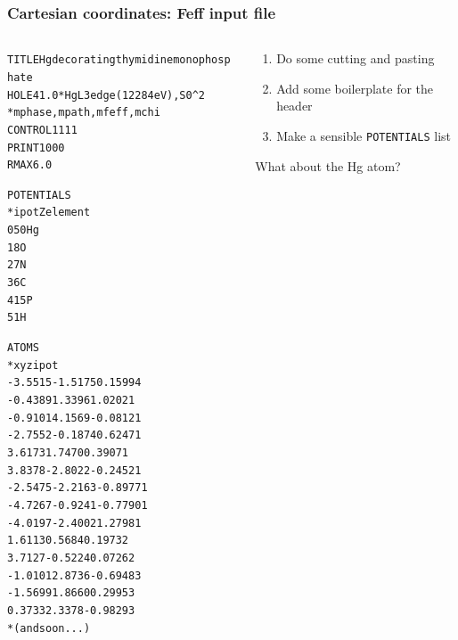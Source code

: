 \documentclass[10pt, xcolor=x11names, compress]{beamer}
\begin{document}
\begin{frame}[fragile]
  \frametitle{Cartesian coordinates: Feff input file}
  \begin{columns}
    \begin{column}{0.5\linewidth}
  \begin{alltt}
\tiny
 {\color{Green4}TITLE Hg decorating thymidine monophosphate}
 {\color{Purple2}HOLE}      4   1.0  {\color{Blue4} *  Hg L3 edge (12284 eV), S0^2}
 {\color{Blue4}*         mphase,mpath,mfeff,mchi}
 {\color{SteelBlue2}CONTROL}   1      1     1     1
 {\color{SteelBlue2}PRINT}     1      0     0     0
 {\color{Purple2}RMAX}      6.0

 {\color{Brown4}POTENTIALS}
 {\color{Blue4}*    ipot   Z  element}
        0   50   Hg
        1    8   O
        2    7   N
        3    6   C
        4   15   P
        5    1   H

 {\color{Brown4}ATOMS}
 {\color{Blue4}*   x         y         z    ipot}
   -3.5515   -1.5175    0.1599 4
   -0.4389    1.3396    1.0202 1
   -0.9101    4.1569   -0.0812 1
   -2.7552   -0.1874    0.6247 1
    3.6173    1.7470    0.3907 1
    3.8378   -2.8022   -0.2452 1
   -2.5475   -2.2163   -0.8977 1
   -4.7267   -0.9241   -0.7790 1
   -4.0197   -2.4002    1.2798 1
    1.6113    0.5684    0.1973 2
    3.7127   -0.5224    0.0726 2
   -1.0101    2.8736   -0.6948 3
   -1.5699    1.8660    0.2995 3
    0.3733    2.3378   -0.9829 3
 {\color{Blue4}*   (and so on...)}
  \end{alltt}
    \end{column}
    \begin{column}{0.5\linewidth}
      \begin{enumerate}
      \item Do some cutting and pasting
      \item Add some boilerplate for the header
      \item Make a sensible {\color{Brown4}\texttt{POTENTIALS}} list
      \end{enumerate}

      \bigskip

      What about the Hg atom?
    \end{column}
  \end{columns}
\end{frame}
\end{document}
